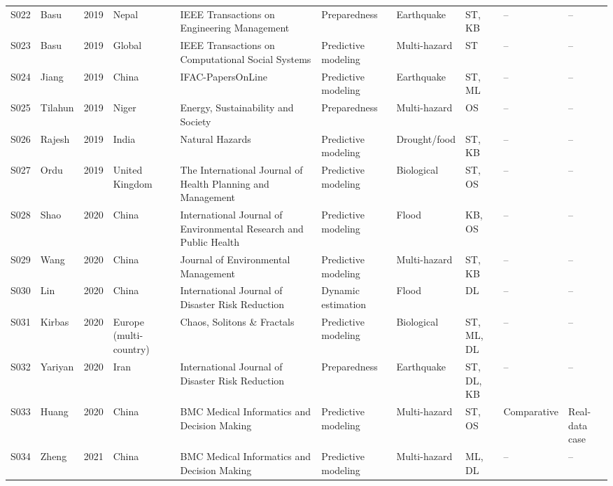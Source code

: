 \begin{landscape}
\begin{longtable}{@{}L{0.9cm}L{2.9cm}L{0.8cm}L{2.1cm}L{3.1cm}L{2.4cm}L{2.0cm}L{1.8cm}L{2.1cm}L{2.0cm}@{}}
S022 & Basu \cite{Basu2019ADTN} & 2019 & Nepal & IEEE Transactions on Engineering Management & Preparedness & Earthquake & ST, KB & -- & -- \\
S023 & Basu \cite{Basu2019ExtractingOperations} & 2019 & Global & IEEE Transactions on Computational Social Systems & Predictive modeling & Multi-hazard & ST & -- & -- \\
S024 & Jiang \cite{Jiang2019EmergencyEarthquakes} & 2019 & China & IFAC-PapersOnLine & Predictive modeling & Earthquake & ST, ML & -- & -- \\
S025 & Tilahun \cite{Tilahun2019SupplyNiger} & 2019 & Niger & Energy, Sustainability and Society & Preparedness & Multi-hazard & OS & -- & -- \\
S026 & Rajesh \cite{Rajesh2019Grey-India} & 2019 & India & Natural Hazards & Predictive modeling & Drought/food & ST, KB & -- & -- \\
S027 & Ordu \cite{Ordu2019AServices} & 2019 & United Kingdom & The International Journal of Health Planning and Management & Predictive modeling & Biological & ST, OS & -- & -- \\
S028 & Shao \cite{Shao2020ReliefClassification} & 2020 & China & International Journal of Environmental Research and Public Health & Predictive modeling & Flood & KB, OS & -- & -- \\
S029 & Wang \cite{Wang2020EmergencyMethod} & 2020 & China & Journal of Environmental Management & Predictive modeling & Multi-hazard & ST, KB & -- & -- \\
S030 & Lin \cite{Lin2020ADisaster} & 2020 & China & International Journal of Disaster Risk Reduction & Dynamic estimation & Flood & DL & -- & -- \\
S031 & Kirbas \cite{Kirbas2020ComparativeApproaches} & 2020 & Europe (multi-country) & Chaos, Solitons \& Fractals & Predictive modeling & Biological & ST, ML, DL & -- & -- \\
S032 & Yariyan \cite{Yariyan2020EarthquakeIran} & 2020 & Iran & International Journal of Disaster Risk Reduction & Preparedness & Earthquake & ST, DL, KB & -- & -- \\
S033 & Huang \cite{Huang2020MedicalMethod} & 2020 & China & BMC Medical Informatics and Decision Making & Predictive modeling & Multi-hazard & ST, OS & Comparative & Real-data case \\
S034 & Zheng \cite{Zheng2021ReinforcementCare} & 2021 & China & BMC Medical Informatics and Decision Making & Predictive modeling & Multi-hazard & ML, DL & -- & -- \\

\end{longtable}
\end{landscape}
